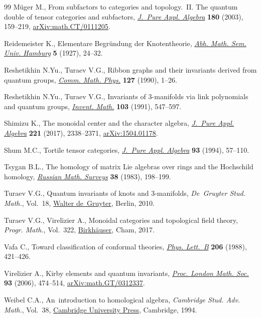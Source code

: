 \documentclass[pdftex]{sigma}
\numberwithin{equation}{section}
\begin{document}
\begin{thebibliography}{99}
M\"uger M., From subfactors to categories and topology.~{II}. {T}he quantum
 double of tensor categories and subfactors,
 \href{https://doi.org/10.1016/S0022-4049(02)00248-7}{\textit{J.~Pure Appl.
 Algebra}} \textbf{180} (2003), 159--219,
 \href{http://arxiv.org/abs/math.CT/0111205}{arXiv:math.CT/0111205}.

Reidemeister K., Elementare {B}egr\"undung der {K}notentheorie,
 \href{https://doi.org/10.1007/BF02952507}{\textit{Abh. Math. Sem. Univ.
 Hamburg}} \textbf{5} (1927), 24--32.

Reshetikhin N.Yu., Turaev V.G., Ribbon graphs and their invariants derived from
 quantum groups, \href{https://doi.org/10.1007/BF02096491}{\textit{Comm. Math.
 Phys.}} \textbf{127} (1990), 1--26.

Reshetikhin N.Yu., Turaev V.G., Invariants of {$3$}-manifolds via link
 polynomials and quantum groups,
 \href{https://doi.org/10.1007/BF01239527}{\textit{Invent. Math.}}
 \textbf{103} (1991), 547--597.

Shimizu K., The monoidal center and the character algebra,
 \href{https://doi.org/10.1016/j.jpaa.2016.12.037}{\textit{J.~Pure Appl.
 Algebra}} \textbf{221} (2017), 2338--2371,
 \href{http://arxiv.org/abs/1504.01178}{arXiv:1504.01178}.

Shum M.C., Tortile tensor categories,
 \href{https://doi.org/10.1016/0022-4049(92)00039-T}{\textit{J.~Pure Appl.
 Algebra}} \textbf{93} (1994), 57--110.

Tsygan B.L., The homology of matrix {L}ie algebras over rings and the
 {H}ochschild homology,
 \href{https://doi.org/10.1070/RM1983v038n02ABEH003481}{\textit{Russian Math.
 Surveys}} \textbf{38} (1983), 198--199.

Turaev V.G., Quantum invariants of knots and 3-manifolds, \textit{De~Gruyter
 Stud. Math.}, Vol.~18, \href{https://doi.org/10.1515/9783110221848}{Walter
 de~Gruyter}, Berlin, 2010.

Turaev V.G., Virelizier A., Monoidal categories and topological field theory,
 \textit{Progr. Math.}, Vol.~322,
 \href{https://doi.org/10.1007/978-3-319-49834-8}{Birkh\"auser}, Cham, 2017.

Vafa C., Toward classification of conformal theories,
 \href{https://doi.org/10.1016/0370-2693(88)91603-6}{\textit{Phys. Lett.~B}}
 \textbf{206} (1988), 421--426.

Virelizier A., Kirby elements and quantum invariants,
 \href{https://doi.org/10.1112/S0024611506015905}{\textit{Proc. London Math.
 Soc.}} \textbf{93} (2006), 474--514,
 \href{http://arxiv.org/abs/math.GT/0312337}{arXiv:math.GT/0312337}.

Weibel C.A., An~introduction to homological algebra, \textit{Cambridge Stud.
 Adv. Math.}, Vol.~38,
 \href{https://doi.org/10.1017/CBO9781139644136}{Cambridge University Press},
 Cambridge, 1994.

\end{thebibliography}\LastPageEnding
\end{document}
